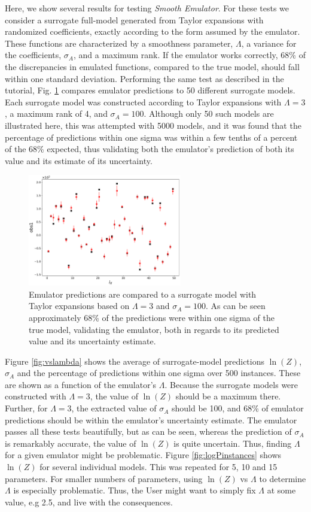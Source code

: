 \documentclass[UserManual.tex]{subfiles}
\begin{document}
Here, we show several results for testing {\it Smooth Emulator}. For these tests we consider a surrogate full-model generated from Taylor expansions with randomized coefficients, exactly according to the form assumed by the emulator. These functions are characterized by a smoothness parameter, $\Lambda$, a variance for the coefficients, $\sigma_A$, and a maximum rank. If the emulator works correctly, 68\% of the discrepancies in emulated functions, compared to the true model, should fall within one standard deviation. Performing the same test as described in the tutorial, Fig. \ref{fig:smoothtest_vsfullmodel} compares emulator predictions to 50 different surrogate models. Each surrogate model was constructed according to Taylor expansions with $\Lambda=3$, a maximum rank of 4, and $\sigma_A=100$. Although only 50 such models are illustrated here, this was attempted with 5000 models, and it was found that the percentage of predictions within one sigma was within a few tenths of a percent of the 68\% expected, thus validating both the emulator's prediction of both its value and its estimate of its uncertainty.
\begin{figure}
\centerline{\includegraphics[width=0.6\textwidth]{figs/YvsY_smooth}}
\caption{\label{fig:smoothtest_vsfullmodel}
Emulator predictions are compared to a surrogate model with Taylor expansions based on $\Lambda=3$ and $\sigma_A=100$. As can be seen approximately 68\% of the predictions were within one sigma of the true model, validating the emulator, both in regards to its predicted value and its uncertainty estimate.}
\end{figure}

Figure \ref{fig:vslambda} shows the average of surrogate-model predictions $\ln(Z)$, $\sigma_A$ and the percentage of predictions within one sigma over 500 instances. These are shown as a function of the emulator's $\Lambda$. Because the surrogate models were constructed with $\Lambda=3$, the value of $\ln(Z)$ should be a maximum there. Further, for $\Lambda=3$, the extracted value of $\sigma_A$ should be 100, and 68\% of emulator predictions should be within the emulator's uncertainty estimate. The emulator passes all these tests beautifully, but as can be seen, whereas the prediction of $\sigma_A$ is remarkably accurate, the value of $\ln(Z)$ is quite uncertain. Thus, finding $\Lambda$ for a given emulator might be problematic. Figure \ref{fig:logPinstances} shows $\ln(Z)$ for several individual models. This was repeated for 5, 10 and 15 parameters. For smaller numbers of parameters, using $\ln(Z)$ vs $\Lambda$ to determine $\Lambda$  is especially problematic. Thus, the User might want to simply fix $\Lambda$ at some value, e.g 2.5, and live with the consequences.
\end{document}
